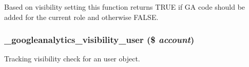 \label{googleanalytics_8module_a2a9375ef0b0ef1b4cffc3fb8923d1c77}
Based on visibility setting this function returns TRUE if GA code should be added for the current role and otherwise FALSE. \hypertarget{googleanalytics_8module_a17b559139935d05a4b7c2b26aa2b51db}{
\subsubsection[{\_\-googleanalytics\_\-visibility\_\-user}]{\setlength{\rightskip}{0pt plus 5cm}\_\-googleanalytics\_\-visibility\_\-user (\$ {\em account})}}
\label{googleanalytics_8module_a17b559139935d05a4b7c2b26aa2b51db}
Tracking visibility check for an user object.


